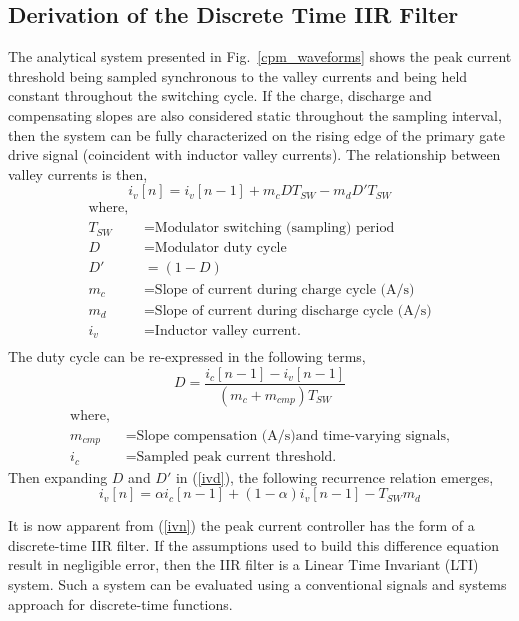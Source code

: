 \documentclass[conference]{IEEEtran}
\begin{document}
\subsection{Derivation of the Discrete Time IIR Filter}
The analytical system presented in Fig.~\ref{cpm_waveforms} shows the peak current threshold being sampled synchronous to the valley currents and being held constant throughout the switching cycle.  If the charge, discharge and compensating slopes are also considered static throughout the sampling interval, then the system can be fully characterized on the rising edge of the primary gate drive signal (coincident with inductor valley currents).  The relationship between valley currents is then,
\begin{equation}
i_v[n] =  i_v[n-1] + m_c D T_{SW} - m_d  D' T_{SW}   \label{ivd}
\end{equation} 
\begin{align*}
\text{where, } \\
T_{SW} &= \text{Modulator switching (sampling) period} \\
D &= \text{Modulator duty cycle} \\
D' &= (1-D) \\
m_c &= \text{Slope of current during charge cycle (A/s)} \\
m_d &= \text{Slope of current during discharge cycle (A/s)}\\
i_v &= \text{Inductor valley current.} \\
\end{align*}
The duty cycle can be re-expressed in the following terms,
\begin{equation}
D = \dfrac{i_c [n-1] - i_v [n-1]} {(m_c + m_{cmp})T_{SW}}
\end{equation}
\begin{align*}
\text{where, } \\
m_{cmp} &= \text{Slope compensation (A/s)}
\text{and time-varying signals,} \\
i_c &= \text{Sampled peak current threshold.} 
\end{align*}
Then expanding $ D $ and $ D' $ in (\ref{ivd}), the following recurrence relation emerges,
\begin{equation}
i_v[n] =  \alpha i_c[n-1] + ( 1 - \alpha ) i_v [n-1] - T_{SW} m_d   \label{ivn}
\end{equation}

It is now apparent from (\ref{ivn}) the peak current controller has the form of a discrete-time IIR filter. If the assumptions used to build this difference equation result in negligible error, then the IIR filter is a Linear Time Invariant (LTI) system. Such a system can be evaluated using a conventional signals and systems approach for discrete-time functions.
\end{document}
